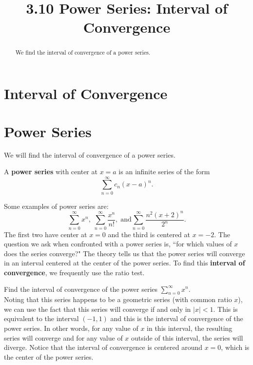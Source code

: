 \documentclass[handout]{ximera}
\title{3.10 Power Series: Interval of Convergence}
\begin{document}
\begin{abstract}
We find the interval of convergence of a power series.
\end{abstract}

\maketitle

\section{Interval of Convergence}

\section{Power Series}

We will find the interval of convergence of a power series.

\begin{definition}
A \textbf{power series} with center at $x = a$ is an infinite series of the form
\[
\sum_{n=0}^\infty c_n(x-a)^n.
\]
\end{definition}

Some examples of power series are:
\[ 
\sum_{n=0}^\infty x^n, \; \sum_{n=0}^\infty \frac{x^n}{n!}, \;\text{and} \sum_{n=0}^\infty \frac{n^2(x+ 2)^n}{2^n}.
\]
The first two have center at $x = 0$ and the third is centered at $x = -2$. 
The question we ask when confronted with a power series is, ``for which values of $x$ does the series converge?"
The theory tells us that the power series will converge in an interval centered at the center of the power series.
To find this \textbf{interval of convergence}, we frequently use the ratio test.

\begin{example}[example 1]
Find the interval of convergence of the power series $\displaystyle{\sum_{n=0}^\infty x^n}$.\\
Noting that this series happens to be a geometric series (with common ratio $x$), we can use the fact that this series will converge 
if and only in $|x| < 1$.  This is equivalent to the interval $(-1, 1)$ and this is the interval of convergence of the power series.
In other words, for any value of $x$ in this interval, 
the resulting series will converge and for any value of $x$ outside of this interval, 
the series will diverge. Notice that the interval of convergence is centered around $x = 0$, which is the center of the power series.
\end{example}
\end{document}
